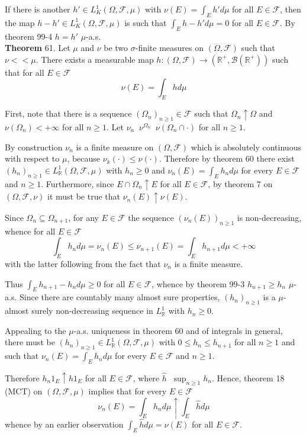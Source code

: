 \documentclass[a4paper]{article}
\newcommand{\brac}[1]{\left ( #1 \right )}
\newcommand{\Real}{\mathbb{R}}
\newcommand{\Fcal}{\mathcal{F}}
\newcommand{\borel}[1]{\mathcal{B}\brac{#1}}
\newcommand{\defn}{\mathop{\overset{\Delta}{=}}\nolimits}
\begin{document}
If there is another $h'\in L^1_K\brac{\Omega, \Fcal, \mu}$ with $\nu\brac{E}=\int_E h' d\mu$ for all $E\in \Fcal$, then the map $h-h'\in L^1_K\brac{\Omega, \Fcal, \mu}$ is such that $\int_E h-h' d\mu=0$ for all $E\in \Fcal$. By theorem 99-4 $h=h'$ $\mu$-a.s.\\

\label{thm:radon_nikodym_sigma_finite_meas} \noindent \textbf{Theorem} 61.
Let $\mu$ and $\nu$ be two $\sigma$-finite measures on $\brac{\Omega, \Fcal}$ such that $\nu<<\mu$. There exists a measurable map $h:\brac{\Omega, \Fcal}\to\brac{\Real^+, \borel{\Real^+}}$ such that for all $E\in \Fcal$ \[\nu\brac{E} = \int_E h d\mu\]

First, note that there is a sequence $\brac{\Omega_n}_{n\geq 1}\in\Fcal$ such that $\Omega_n\uparrow \Omega$ and $\nu\brac{\Omega_n}<+\infty$ for all $n\geq 1$. Let $\nu_n\defn \nu^{\Omega_n}\defn \nu\brac{\Omega_n\cap \cdot}$ for all $n\geq 1$.

By construction $\nu_n$ is a finite measure on $\brac{\Omega, \Fcal}$ which is absolutely continuous with respect to $\mu$, because $\nu_k\brac{\cdot}\leq \nu\brac{\cdot}$. Therefore by theorem 60 there exist $\brac{h_n}_{n\geq1}\in L^1_\Real\brac{\Omega, \Fcal, \mu}$ with $h_n\geq 0$ and $\nu_n\brac{E} = \int_E h_n d\mu$ for every $E\in \Fcal$ and $n\geq 1$. Furthermore, since $E\cap \Omega_n\uparrow E$ for all $E\in \Fcal$, by theorem 7 on $\brac{\Omega, \Fcal, \nu}$ it must be true that $\nu_n\brac{E}\uparrow \nu\brac{E}$.

Since $\Omega_n\subseteq \Omega_{n+1}$, for any $E\in \Fcal$ the sequence $\brac{\nu_n\brac{E}}_{n\geq1}$ is non-decreasing, whence for all $E\in \Fcal$ \[\int_E h_n d\mu = \nu_n\brac{E}\leq \nu_{n+1}\brac{E} = \int_E h_{n+1} d\mu<+\infty\] with the latter following from the fact that $\nu_n$ is a finite measure.

Thus $\int_E h_{n+1} - h_n d\mu\geq 0$ for all $E\in\Fcal$, whence by theorem 99-3 $h_{n+1}\geq h_n$ $\mu$-a.s. Since there are countably many almost sure properties, $\brac{h_n}_{n\geq 1}$ is a $\mu$-almost surely non-decreasing sequence in $L^1_\Real$ with $h_n\geq0$.

Appealing to the $\mu$-a.s. uniqueness in theorem 60 and of integrals in general, there must be $\brac{h_n}_{n\geq 1}\in L^1_\Real\brac{\Omega, \Fcal, \mu}$ with $0\leq h_n\leq h_{n+1}$ for all $n\geq 1$ and such that $\nu_n\brac{E} = \int_E h_n d\mu$ for every $E\in \Fcal$ and $n\geq 1$.

Therefore $h_n 1_E\uparrow \hat{h} 1_E$ for all $E\in \Fcal$, where $\hat{h}\defn \sup_{n\geq 1} h_n$. Hence, theorem 18 (MCT) on $\brac{\Omega, \Fcal, \mu}$ implies that for every $E\in \Fcal$ \[\nu_n\brac{E} = \int_E h_n d\mu \uparrow \int_E \hat{h} d\mu\] whence by an earlier observation $\int_E \hat{h} d\mu = \nu\brac{E}$ for all $E\in \Fcal$.
\end{document}

